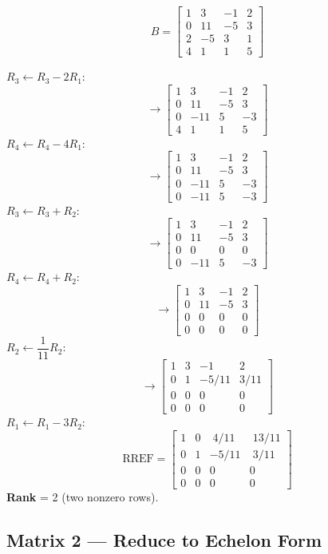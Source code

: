\documentclass[12pt]{article}
\begin{document}
\[
  B = \begin{bmatrix}1&3&-1&2\\0&11&-5&3\\2&-5&3&1\\4&1&1&5\end{bmatrix}
\]

\begin{solbox}

$R_3 \leftarrow R_3 - 2R_1$:
\[
  \to \begin{bmatrix}1&3&-1&2\\0&11&-5&3\\0&-11&5&-3\\4&1&1&5\end{bmatrix}
\]
$R_4 \leftarrow R_4 - 4R_1$:
\[
  \to \begin{bmatrix}1&3&-1&2\\0&11&-5&3\\0&-11&5&-3\\0&-11&5&-3\end{bmatrix}
\]
$R_3 \leftarrow R_3 + R_2$:
\[
  \to \begin{bmatrix}1&3&-1&2\\0&11&-5&3\\0&0&0&0\\0&-11&5&-3\end{bmatrix}
\]
$R_4 \leftarrow R_4 + R_2$:
\[
  \to \begin{bmatrix}1&3&-1&2\\0&11&-5&3\\0&0&0&0\\0&0&0&0\end{bmatrix}
\]
$R_2 \leftarrow \dfrac{1}{11}R_2$:
\[
  \to \begin{bmatrix}1&3&-1&2\\0&1&-5/11&3/11\\0&0&0&0\\0&0&0&0\end{bmatrix}
\]
$R_1 \leftarrow R_1 - 3R_2$:
\[
  \boxed{
    \text{RREF} = \begin{bmatrix}1&0&\;4/11&\;13/11\\[4pt]0&1&-5/11&\;3/11\\[4pt]0&0&0&0\\0&0&0&0\end{bmatrix}
  }
\]
\textbf{Rank} = 2 \quad (two nonzero rows).
\end{solbox}

\subsection{Matrix 2 — Reduce to Echelon Form}
\end{document}
